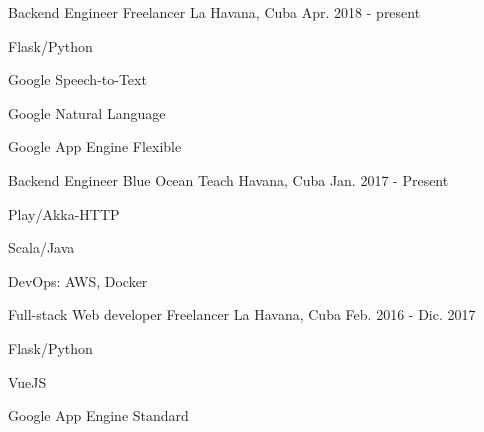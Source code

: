 


\begin{cventries}


\cventry
{Backend Engineer} %
{Freelancer} %
{La Havana, Cuba} %
{Apr. 2018 - present} %
{ %
\begin{cvitems}
\item {Flask/Python}
\item {Google Speech-to-Text}
\item {Google Natural Language}
\item {Google App Engine Flexible}
\end{cvitems}
}


\cventry
{Backend Engineer} %
{Blue Ocean Teach} %
{Havana, Cuba} %
{Jan. 2017 - Present} %
{ %
\begin{cvitems}
\item {Play/Akka-HTTP}
\item {Scala/Java}
\item {DevOps: AWS, Docker}
\end{cvitems}
}


\cventry
{Full-stack Web developer} %
{Freelancer} %
{La Havana, Cuba} %
{Feb. 2016 - Dic. 2017} %
{ %
\begin{cvitems}
\item {Flask/Python}
\item {VueJS}
\item {Google App Engine Standard}
\end{cvitems}
}



\end{cventries}
